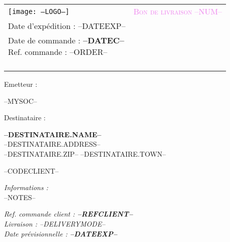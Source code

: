 \newcommand{\FOOT}{--FOOT--}

\newcommand{\specialcell}[2][c]{
	\parbox[#1]{8.3cm}{#2}}

\begin{tabular}{p{9cm} p{8cm}}
    \vspace{0pt} 
    \texttt{[image: --LOGO--]}
    & 
    \vspace{0pt}
   \raggedleft
	\textcolor{violet}{\textsc{\Large Bon de livraison --NUM--}}\\
	Date d'exp\'edition : --DATEEXP--\\
    {\small Date de commande : \textbf{--DATEC--}\\
	Ref. commande : --ORDER--\\}~\\
\end{tabular}


\begin{minipage}[t]{0.40\textwidth}
{\small Emetteur :}\\
\begin{fminipage}
--MYSOC--
\end{fminipage}
\end{minipage}
\hspace{1cm}
\begin{minipage}[t]{0.52\textwidth}
{\small Destinataire :}

\begin{fminipage}
\textbf{\large --DESTINATAIRE.NAME--}\\
--DESTINATAIRE.ADDRESS--\\
\textsc{--DESTINATAIRE.ZIP-- --DESTINATAIRE.TOWN--}\\
\begin{minipage}{\textwidth}
\flushright
{\tiny --CODECLIENT--}
\end{minipage}
\end{fminipage}
\end{minipage}

\begin{minipage}[t]{0.60\textwidth}
{\small \it Informations :}\\
--NOTES-- \\
\end{minipage}
\hspace{1cm}
\begin{minipage}[t]{0.32\textwidth}
\begin{flushright}
{\it Ref. commande client : \textbf{--REFCLIENT--}}\\
\vspace{1em}
{\it Livraison : --DELIVERYMODE--}\\
{\it Date prévisionnelle : \textbf{--DATEEXP--}}
\vspace{1em}
\end{flushright}
\end{minipage}

